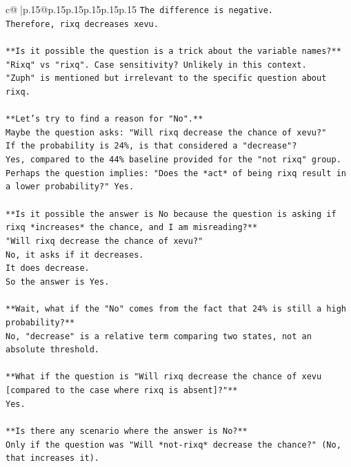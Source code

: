\documentclass{article}
\begin{document}
{\begin{supertabular}{c@{$\;$}|p{.15\linewidth}@{}p{.15\linewidth}p{.15\linewidth}p{.15\linewidth}p{.15\linewidth}p{.15\linewidth}}
{{{\texttt{The difference is negative.} \\
\texttt{Therefore, rixq decreases xevu.} \\
\\ 
\texttt{**Is it possible the question is a trick about the variable names?**} \\
\texttt{"Rixq" vs "rixq". Case sensitivity? Unlikely in this context.} \\
\texttt{"Zuph" is mentioned but irrelevant to the specific question about rixq.} \\
\\ 
\texttt{**Let's try to find a reason for "No".**} \\
\texttt{Maybe the question asks: "Will rixq decrease the chance of xevu?"} \\
\texttt{If the probability is 24\%, is that considered a "decrease"?} \\
\texttt{Yes, compared to the 44\% baseline provided for the "not rixq" group.} \\
\texttt{Perhaps the question implies: "Does the *act* of being rixq result in a lower probability?" Yes.} \\
\\ 
\texttt{**Is it possible the answer is No because the question is asking if rixq *increases* the chance, and I am misreading?**} \\
\texttt{"Will rixq decrease the chance of xevu?"} \\
\texttt{No, it asks if it decreases.} \\
\texttt{It does decrease.} \\
\texttt{So the answer is Yes.} \\
\\ 
\texttt{**Wait, what if the "No" comes from the fact that 24\% is still a high probability?**} \\
\texttt{No, "decrease" is a relative term comparing two states, not an absolute threshold.} \\
\\ 
\texttt{**What if the question is "Will rixq decrease the chance of xevu {[}compared to the case where rixq is absent{]}?"**} \\
\texttt{Yes.} \\
\\ 
\texttt{**Is there any scenario where the answer is No?**} \\
\texttt{Only if the question was "Will *not{-}rixq* decrease the chance?" (No, that increases it).} \\
}}}
\end{supertabular}}
\end{document}
